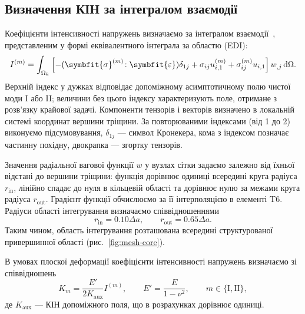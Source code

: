 \documentclass[a4paper,12pt]{article}
\newcommand{\bm}[1]{\ifstrequal{#1}{0}{\symbf{#1}}{\symbfit{#1}}}
\newcommand{\dd}{\mathrm{d}}
\begin{document}
\subsection{Визначення КІН за інтегралом взаємодії}
Коефіцієнти інтенсивності напружень визначаємо за інтегралом взаємодії~\cite{YauWangCorten1980},
представленим у формі еквівалентного інтеграла за областю (EDI):
\begin{equation}
 I^{(m)}=\int_{\Omega_k}
 \left[-(\bm\sigma^{(m)}\!:\bm\varepsilon)\delta_{1j}
 +\sigma_{ij}u^{(m)}_{i,1}
 +\sigma^{(m)}_{ij}u_{i,1}\right]w_{,j}\,\dd\Omega.
 \label{eq:interaction}
\end{equation}
Верхній індекс у дужках відповідає допоміжному асимптотичному полю чистої моди I або II;
величини без цього індексу характеризують поле, отримане з розв’язку крайової задачі. Компоненти тензорів
і векторів визначено в локальній системі координат вершини тріщини. За повторюваними індексами
(від 1 до 2) виконуємо підсумовування, $\delta_{1j}$ --- символ Кронекера, кома з індексом
позначає частинну похідну, двокрапка --- згортку тензорів.

Значення радіальної вагової функції $w$ у вузлах сітки задаємо залежно від їхньої
відстані до вершини тріщини: функція дорівнює одиниці всередині круга радіуса $r_{\mathrm{in}}$,
лінійно спадає до нуля в кільцевій області та дорівнює нулю за межами круга радіуса $r_{\mathrm{out}}$.
Градієнт функції обчислюємо за її інтерполяцією в елементі T6.
Радіуси області інтегрування визначаємо співвідношеннями
\[
 r_{\mathrm{in}}=0.10\Delta a,\qquad r_{\mathrm{out}}=0.65\Delta a.
\]
Таким чином, область інтегрування розташована всередині структурованої привершинної області
(рис.~\ref{fig:mesh-core}).

В умовах плоскої деформації коефіцієнти інтенсивності напружень визначаємо зі співвідношень
\begin{equation}
 K_m=\frac{E'}{2K_{\mathrm{aux}}}I^{(m)},\qquad
 E'=\frac{E}{1-\nu^2},\qquad m\in\{\mathrm I,\mathrm{II}\},
 \label{eq:normalization}
\end{equation}
де $K_{\mathrm{aux}}$ --- КІН допоміжного поля, що в розрахунках дорівнює одиниці.
\end{document}
